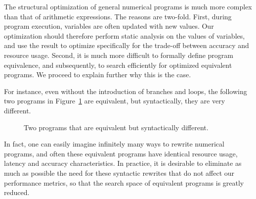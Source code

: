 The structural optimization of general numerical programs is much more complex
than that of arithmetic expressions.  The reasons are two-fold.  First,
during program execution, variables are often updated with new values.  Our
optimization should therefore perform static analysis on the values of
variables, and use the result to optimize specifically for the trade-off
between accuracy and resource usage.  Second, it is much more difficult to
formally define program equivalence, and subsequently, to search efficiently
for optimized equivalent programs.  We proceed to explain further why this is
the case.

For instance, even without the introduction of branches and loops, the
following two programs in Figure~\ref{bg:fig:equiv_progs} are equivalent, but
syntactically, they are very different.
\begin{figure}[ht]
    \centering
     \qquad \qquad
    \caption{%
        Two programs that are equivalent but syntactically different.
    }\label{bg:fig:equiv_progs}
\end{figure}

In fact, one can easily imagine infinitely many ways to rewrite numerical
programs, and often these equivalent programs have identical resource usage,
latency and accuracy characteristics.  In practice, it is desirable to
eliminate as much as possible the need for these syntactic rewrites that do not
affect our performance metrics, so that the search space of equivalent programs
is greatly reduced.
